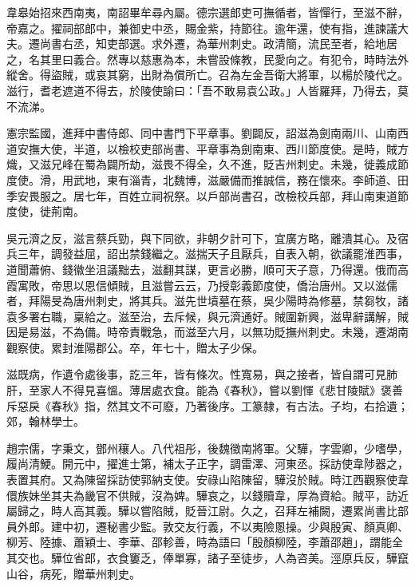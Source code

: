 \begin{pinyinscope}
 韋皋始招來西南夷，南詔畢牟尋內屬。德宗選郎吏可撫循者，皆憚行，至滋不辭，帝嘉之。擢祠部郎中，兼御史中丞，賜金紫，持節往。逾年還，使有指，進諫議大夫。遷尚書右丞，知吏部選。求外遷，為華州刺史。政清簡，流民至者，給地居之，名其里曰義合。然專以慈惠為本，未嘗設條教，民愛向之。有犯令，時時法外縱舍。得盜賊，或哀其窮，出財為償所亡。召為左金吾衛大將軍，以楊於陵代之。滋行，耆老遮道不得去，於陵使諭曰：「吾不敢易袁公政。」人皆羅拜，乃得去，莫不流涕。



 憲宗監國，進拜中書侍郎、同中書門下平章事。劉闢反，詔滋為劍南兩川、山南西道安撫大使，半道，以檢校吏部尚書、平章事為劍南東、西川節度使。是時，賊方熾，又滋兄峰在蜀為闢所劫，滋畏不得全，久不進，貶吉州刺史。未幾，徙義成節度使。滑，用武地，東有淄青，北魏博，滋嚴備而推誠信，務在懷來。李師道、田季安畏服之。居七年，百姓立祠祝祭。以戶部尚書召，改檢校兵部，拜山南東道節度使，徙荊南。



 吳元濟之反，滋言蔡兵勁，與下同欲，非朝夕計可下，宜廣方略，離潰其心。及宿兵三年，調發益屈，詔出禁錢繼之。滋揣天子且厭兵，自表入朝，欲議罷淮西事，道聞蕭俯、錢徽坐沮議黜去，滋翻其謀，更言必勝，順可天子意，乃得還。俄而高霞寓敗，帝思以恩信傾賊，且滋嘗云云，乃授彰義節度使，僑治唐州。又以滋儒者，拜陽旻為唐州刺史，將其兵。滋先世墳墓在蔡，吳少陽時為修墓，禁芻牧，諸袁多署右職，稟給之。滋至治，去斥候，與元濟通好。賊圍新興，滋卑辭講解，賊因是易滋，不為備。時帝責戰急，而滋至六月，以無功貶撫州刺史。未幾，遷湖南觀察使。累封淮陽郡公。卒，年七十，贈太子少保。



 滋既病，作遺令處後事，訖三年，皆有條次。性寬易，與之接者，皆自謂可見肺肝，至家人不得見喜慍。薄居處衣食。能為《春秋》，嘗以劉惲《悲甘陵賦》褒善斥惡戾《春秋》指，然其文不可廢，乃著後序。工篆隸，有古法。子均，右拾遺；郊，翰林學士。



 趙宗儒，字秉文，鄧州穰人。八代祖彤，後魏徵南將軍。父驊，字雲卿，少嗜學，履尚清鯁。開元中，擢進士第，補太子正字，調雷澤、河東丞。採訪使韋陟器之，表置其府。又為陳留採訪使郭納支使。安祿山陷陳留，驊沒於賊。時江西觀察使韋儇族妹坐其夫為畿官不供賊，沒為婢。驊哀之，以錢贖韋，厚為資給。賊平，訪近屬歸之，時人高其義。驊以嘗陷賊，貶晉江尉。久之，召拜左補闕，遷累尚書比部員外郎。建中初，遷秘書少監。敦交友行義，不以夷險慁操。少與殷寅、顏真卿、柳芳、陸據、蕭穎士、李華、邵軫善，時為語曰「殷顏柳陸，李蕭邵趙」，謂能全其交也。驊位省郎，衣食窶乏，俸單寡，諸子至徒步，人為咨美。涇原兵反，驊竄山谷，病死，贈華州刺史。




\end{pinyinscope}
